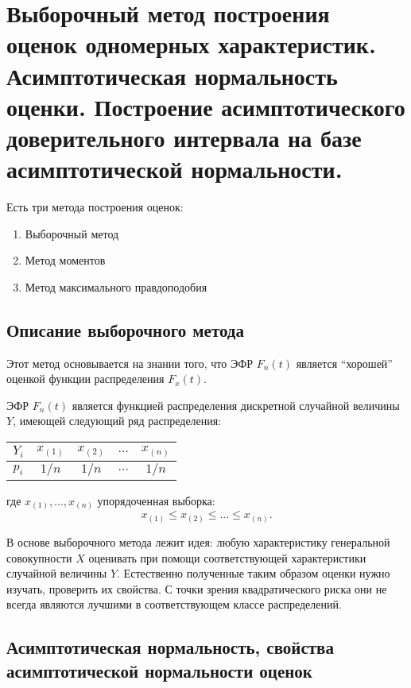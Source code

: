 \section{Выборочный метод построения оценок одномерных характеристик.
Асимптотическая нормальность оценки. Построение асимптотического доверительного
интервала на базе асимптотической нормальности.}

Есть три метода построения оценок:
\begin{enumerate}
  \item Выборочный метод
  \item Метод моментов
  \item Метод максимального правдоподобия
\end{enumerate}


\subsection{Описание выборочного метода}
Этот метод основывается на знании того, что ЭФР $F_n(t)$ является ``хорошей''
оценкой функции распределения $F_x(t)$.

ЭФР $F_n(t)$ является функцией распределения дискретной случайной величины
$Y$, имеющей следующий ряд распределения:


\begin{center}
  \begin{tabular}{ c|c|c|c|c }
    $Y_i$ & $x_{(1)}$ & $x_{(2)}$ & $...$ & $x_{(n)}$ \\
    \hline
    $p_i$ & $1/n$ & $1/n$ & $...$ & $1/n$ \\
  \end{tabular}
\end{center}

где $x_{(1)}, ..., x_{(n)}$ упорядоченная выборка:
\[
  x_{(1)} \leqslant x_{(2)} \leqslant ... \leqslant x_{(n)}
.\]

В основе выборочного метода лежит идея:
любую характеристику генеральной совокупности $X$ оценивать при помощи соответствующей характеристики случайной величины $Y$. Естественно полученные таким образом оценки нужно изучать, проверить их свойства. С точки зрения квадратического риска они не всегда являются лучшими в соответствующем классе распределений.

\subsection{Асимптотическая нормальность, свойства асимптотической нормальности оценок}

